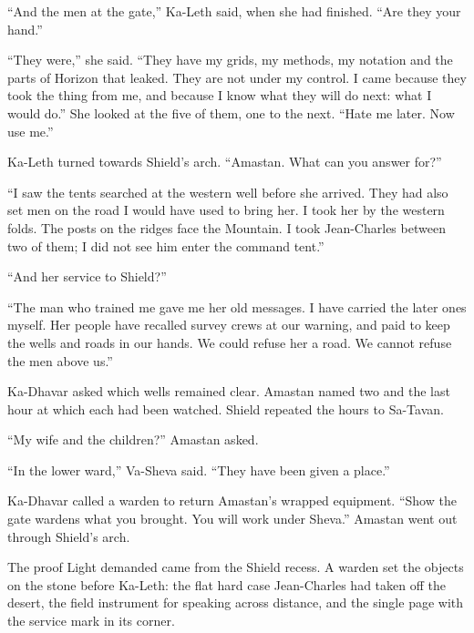 ``And the men at the gate,'' Ka-Leth said, when she had finished. ``Are they your hand.''\par

``They were,'' she said. ``They have my grids, my methods, my notation and the parts of Horizon that leaked. They are not under my control. I came because they took the thing from me, and because I know what they will do next: what I would do.'' She looked at the five of them, one to the next. ``Hate me later. Now use me.''\par

Ka-Leth turned towards Shield's arch. ``Amastan. What can you answer for?''\par

``I saw the tents searched at the western well before she arrived. They had also set men on the road I would have used to bring her. I took her by the western folds. The posts on the ridges face the Mountain. I took Jean-Charles between two of them; I did not see him enter the command tent.''\par

``And her service to Shield?''\par

``The man who trained me gave me her old messages. I have carried the later ones myself. Her people have recalled survey crews at our warning, and paid to keep the wells and roads in our hands. We could refuse her a road. We cannot refuse the men above us.''\par

Ka-Dhavar asked which wells remained clear. Amastan named two and the last hour at which each had been watched. Shield repeated the hours to Sa-Tavan.\par

``My wife and the children?'' Amastan asked.\par

``In the lower ward,'' Va-Sheva said. ``They have been given a place.''\par

Ka-Dhavar called a warden to return Amastan's wrapped equipment. ``Show the gate wardens what you brought. You will work under Sheva.'' Amastan went out through Shield's arch.\par

\ornament

The proof Light demanded came from the Shield recess. A warden set the objects on the stone before Ka-Leth: the flat hard case Jean-Charles had taken off the desert, the field instrument for speaking across distance, and the single page with the service mark in its corner.\par

